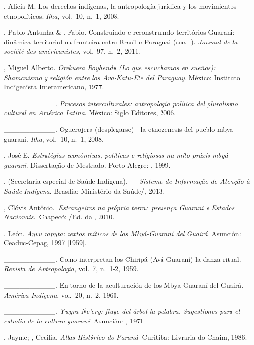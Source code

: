 \begin{Parskip}
, Alicia M. Los derechos indígenas, la antropología jurídica y
los movimientos etnopolíticos. \emph{Ilha}, vol.~10, n.~1, 2008.

, Pablo Antunha \& , Fabio. Construindo e reconstruindo
territórios Guarani: dinâmica territorial na fronteira entre Brasil e
Paraguai (sec. -). \emph{Journal de la société des américanistes}, vol.~97, n.~2,
2011. 

, Miguel Alberto. \emph{Orekuera Royhendu (Lo que escuchamos en
sueños): Shamanismo y religión entre los Ava-Katu-Ete del Paraguay}.
México: Instituto Indigenista Interamericano, 1977.

\_\_\_\_\_\_\_\_\_\_. \emph{Procesos interculturales: antropología política
del pluralismo cultural en América Latina}. México: Siglo  Editores,
2006.

\_\_\_\_\_\_\_\_\_\_. Oguerojera (desplegarse) - la etnogenesis del
pueblo mbya-guarani. \emph{Ilha}, vol.~10, n.~1, 2008.

 , José E. \emph{Estratégias econômicas, políticas e religiosas
na mito-práxis mbyá-guarani}. Dissertação de Mestrado. Porto Alegre:
, 1999.

.  (Secretaria especial de Saúde Indígena). \emph{ — Sistema
de Informação de Atenção à Saúde Indígena}. Brasília: Ministério da
Saúde/, 2013.

, Clóvis Antônio.\emph{~Estrangeiros na própria terra:~presença
Guarani e Estados Nacionais}.~Chapecó: /Ed. da , 2010. 

, León. \emph{Ayvu rapyta: textos míticos de los Mbyá-Guaraní del
Guairá}. Asunción: Ceaduc-Cepag, 1997 [1959].

\_\_\_\_\_\_\_\_\_\_. Como interpretan los Chiripá (Avá Guaraní) la
danza ritual. \emph{Revista de Antropologia}, vol.~7, n.~1-2, 1959.

\_\_\_\_\_\_\_\_\_\_. En torno de la aculturación de los Mbya-Guaraní
del Guairá. \emph{América Indígena}, vol.~20, n.~2, 1960. 

\_\_\_\_\_\_\_\_\_\_. \emph{Ywyra Ñe’ery: fluye del árbol la palabra.
Sugestiones para el estudio de la cultura guaraní}. Asunción: ,
1971.

, Jayme; , Cecília. \emph{Atlas Histórico do Paraná}.
Curitiba: Livraria do Chaim, 1986.


\end{Parskip}
